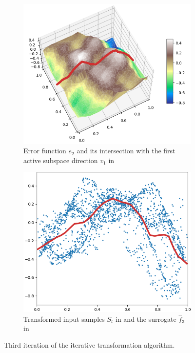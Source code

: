 \documentclass[
  a4paper,  %
  twoside,  %
  bibliography=totoc,
  headsepline,
  cleardoublepage=empty,
  parskip=half,
  draft=false
]{scrbook}
\begin{document}
\begin{mdframed}[style=style]
\begin{figure}[H]
\begin{subfigure}{.5\textwidth}
  \centering
  \includegraphics[width=.85\linewidth]{graphics/pipeline_current_3.png}
  \caption{Error function $e_2$ and its intersection with the first active subspace direction $v_1$ in \reddot}
\end{subfigure}%
\begin{subfigure}{.5\textwidth}
  \centering
  \includegraphics[width=.85\linewidth]{graphics/pipeline_local_3.png}
  \caption{Transformed input samples $S_t$ in \darkblue and the surrogate $\hat{f}_3$ in \reddot}
\end{subfigure}
\delimit
\caption{Third iteration of the iterative transformation algorithm.}
\label{fig:pipeline_3}
\end{figure}
\end{mdframed}
\end{document}
